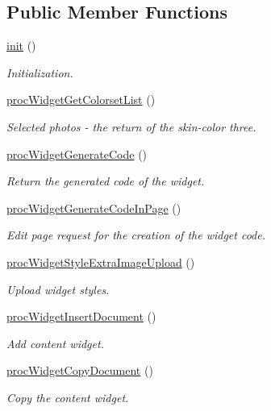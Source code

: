 \subsection*{Public Member Functions}
\begin{DoxyCompactItemize}
\item 
\hyperlink{classwidgetController_aa76890b678d4f18898dc1bed68730eae}{init} ()
\begin{DoxyCompactList}\small\item\em Initialization. \end{DoxyCompactList}\item 
\hyperlink{classwidgetController_a1ea3fa6a1799d8d1190eeeba8424df04}{proc\-Widget\-Get\-Colorset\-List} ()
\begin{DoxyCompactList}\small\item\em Selected photos -\/ the return of the skin-\/color three. \end{DoxyCompactList}\item 
\hyperlink{classwidgetController_ab914871b42db6378aa78aa682daea6a3}{proc\-Widget\-Generate\-Code} ()
\begin{DoxyCompactList}\small\item\em Return the generated code of the widget. \end{DoxyCompactList}\item 
\hyperlink{classwidgetController_a0e6483bd8d30255e5cea027b46fc9288}{proc\-Widget\-Generate\-Code\-In\-Page} ()
\begin{DoxyCompactList}\small\item\em Edit page request for the creation of the widget code. \end{DoxyCompactList}\item 
\hyperlink{classwidgetController_a0abe619fbf8376e7829ade6996c3f707}{proc\-Widget\-Style\-Extra\-Image\-Upload} ()
\begin{DoxyCompactList}\small\item\em Upload widget styles. \end{DoxyCompactList}\item 
\hyperlink{classwidgetController_a2704aca7d4721e2f48c87c47fd2f192b}{proc\-Widget\-Insert\-Document} ()
\begin{DoxyCompactList}\small\item\em Add content widget. \end{DoxyCompactList}\item 
\hyperlink{classwidgetController_a79adfc9bc627022de039909a2139d510}{proc\-Widget\-Copy\-Document} ()
\begin{DoxyCompactList}\small\item\em Copy the content widget. \end{DoxyCompactList}\item 

\end{DoxyCompactItemize}
